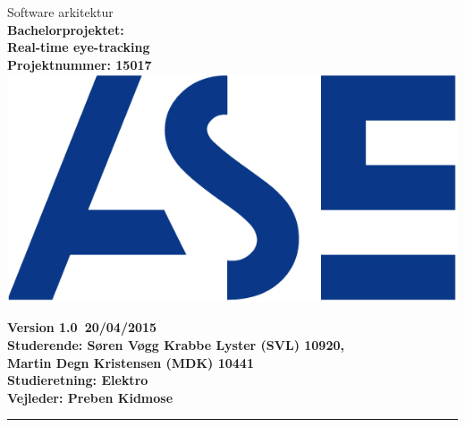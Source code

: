 \documentclass[a4paper,oneside,12pt]{article}
\begin{document}
\begin{titlepage}
\centering
\vfill
{\LARGE Software arkitektur}\\
\vfill
{\bfseries\large
	Bachelorprojektet: \\
	Real-time eye-tracking\\
	Projektnummer: 15017\\
}
\vfill
\includegraphics{ASE_logo.png}
\vfill
{\bfseries\large
	Version 1.0\
	20/04/2015\\
	Studerende: Søren Vøgg Krabbe Lyster (SVL) 10920,\\
	Martin Degn Kristensen (MDK) 10441\\ 
	Studieretning: Elektro \\
	Vejleder: Preben Kidmose \\
	\vfill	
	\rule{6cm}{1pt}
}




\end{titlepage}
\begin{versionhistory}
\end{versionhistory}
\tableofcontents






\end{document}
